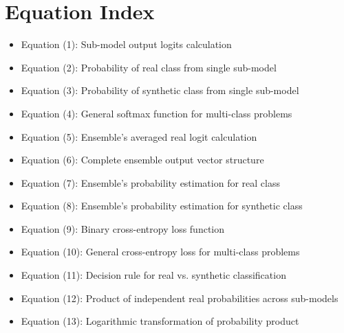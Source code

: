 \documentclass[conference]{IEEEtran}  %
\begin{document}
\section*{Equation Index}
\begin{itemize}
    \item Equation (1): Sub-model output logits calculation
    \item Equation (2): Probability of real class from single sub-model
    \item Equation (3): Probability of synthetic class from single sub-model
    \item Equation (4): General softmax function for multi-class problems
    \item Equation (5): Ensemble's averaged real logit calculation
    \item Equation (6): Complete ensemble output vector structure
    \item Equation (7): Ensemble's probability estimation for real class
    \item Equation (8): Ensemble's probability estimation for synthetic class
    \item Equation (9): Binary cross-entropy loss function
    \item Equation (10): General cross-entropy loss for multi-class problems
    \item Equation (11): Decision rule for real vs. synthetic classification
    \item Equation (12): Product of independent real probabilities across sub-models
    \item Equation (13): Logarithmic transformation of probability product
\end{itemize}
\end{document}
